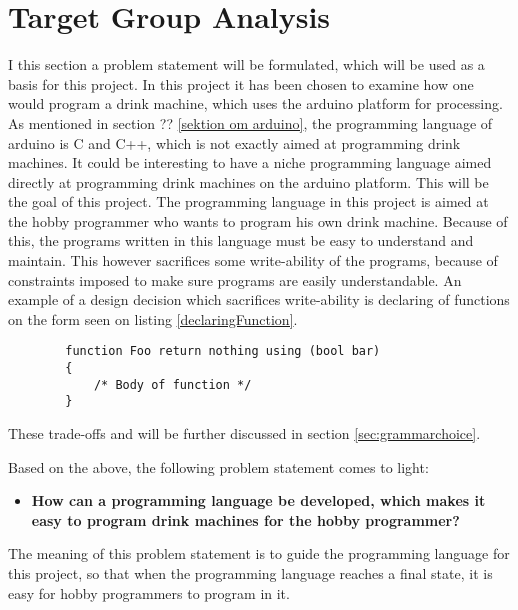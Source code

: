 \section{Target Group Analysis}
I  this section a problem statement will be formulated, which will be used as a basis for this project. In this project it has been chosen to examine how one would program a drink machine, which uses the arduino platform for processing. As mentioned in section ?? \ref{sektion om arduino}, the programming language of arduino is C and C++, which is not exactly aimed at programming drink machines. It could be interesting to have a niche programming language aimed directly at programming drink machines on the arduino platform. This will be the goal of this project. The programming language in this project is aimed at the hobby programmer who wants to program his own drink machine. Because of this, the programs written in this language must be easy to understand and maintain. This however sacrifices some write-ability of the programs, because of constraints imposed to make sure programs are easily understandable. An example of a design decision which sacrifices write-ability is declaring of functions on the form seen on listing \ref{declaringFunction}.

\begin{code}
	\begin{lstlisting}
		function Foo return nothing using (bool bar)
		{
			/* Body of function */
		}
	\end{lstlisting}
\end{code}
These trade-offs and will be further discussed in section \ref{sec:grammarchoice}.

Based on the above, the following problem statement comes to light:
\begin{itemize}
	\item \textbf{How can a programming language be developed, which makes it easy to program drink machines for the hobby programmer?}
\end{itemize}
The meaning of this problem statement is to guide the programming language for this project, so that when the programming language reaches a final state, it is easy for hobby programmers to program in it. 

